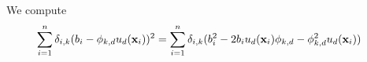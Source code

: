 \documentclass[12pt]{article}
\begin{document}
We compute
\begin{align*}
\sum_{i = 1}^{n}{\delta_{i,k}(b_{i} - \phi_{k,d}u_{d}(\mathbf{x}_{i}))^{2}} &= \sum_{i = 1}^{n}{\delta_{i,k}(b_{i}^{2} - 2b_{i}u_{d}(\mathbf{x}_{i})\phi_{k,d} - \phi_{k,d}^{2}u_{d}(\mathbf{x}_{i}))}
\end{align*}

\end{document}
